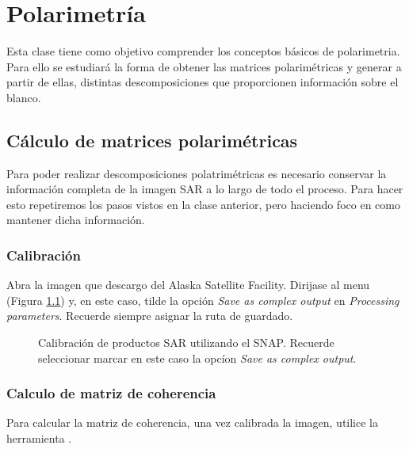 \chapter{Polarimetría}

Esta clase tiene como objetivo comprender los conceptos básicos de polarimetria. Para ello se estudiará la forma de obtener las matrices polarimétricas y generar a partir de ellas, distintas descomposiciones que proporcionen información sobre el blanco.

\section{Cálculo de matrices polarimétricas}

Para poder realizar descomposiciones polatrimétricas es necesario conservar la información completa de la imagen SAR a lo largo de todo el proceso. Para hacer esto repetiremos los pasos vistos en la clase anterior, pero haciendo foco en como mantener dicha información.

\subsection{Calibración}
Abra la imagen  que descargo del Alaska Satellite Facility.  Dirijase al menu  (Figura \ref{fig:calibrar}) y, en este caso, tilde la opción \emph{Save as complex output} en \emph{Processing parameters}. Recuerde siempre asignar la ruta de guardado.

\begin{figure}[h!]
    \centering
    \hspace{1cm}
    \caption{Calibración de productos SAR utilizando el SNAP. Recuerde seleccionar marcar en este caso la opcíon \emph{Save as complex output}.}
    \label{fig:calibrar}
\end{figure}

\subsection{Calculo de matriz de coherencia}

Para calcular la matriz de coherencia, una vez calibrada la imagen, utilice la herramienta .

